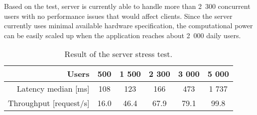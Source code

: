 Based on the test, server is currently able to handle more than 2~300 concurrent users with no performance issues that would affect clients. Since the server currently uses minimal available hardware specification, the computational power can be easily scaled up when the application reaches about 2~000 daily users.

\begin{table}
	\centering
	\begin{tabular}{r || c | c | c | c | c |}
		Users & 500 & 1 500 & 2 300 & 3 000 & 5 000 \\ \hline 
		Latency median [ms] & 108 & 123 & 166 & 473 & 1 737 \\
		Throughput [request/s] & 16.0 & 46.4 & 67.9 & 79.1 & 99.8 \\
	\end{tabular}
	\caption{Result of the server stress test.}
	\label{tab:loadtestresults}
\end{table}	

